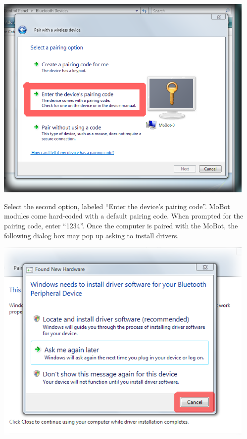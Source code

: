 \documentclass{article}
\begin{document}
\begin{center}
\includegraphics[width=5in]{images/imobot_connect_3.png}
\end{center}

Select the second option, labeled ``Enter the device's pairing code''. MoBot
modules come hard-coded with a default pairing code. When prompted for the
pairing code, enter ``1234''. Once the computer is paired with the MoBot,
the following dialog box may pop up asking to install drivers.

\begin{center}
\includegraphics[width=5in]{images/imobot_connect_4.png}
\end{center}
\end{document}
